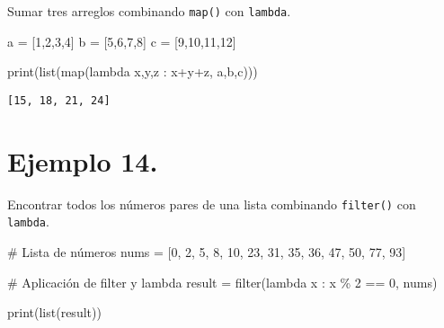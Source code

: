 \documentclass[
  letterpaper,
  DIV=11,
  numbers=noendperiod]{scrreprt}
\newenvironment{Shaded}{\begin{snugshade}}{\end{snugshade}}
\newcommand{\BuiltInTok}[1]{\textcolor[rgb]{0.00,0.23,0.31}{#1}}
\newcommand{\CommentTok}[1]{\textcolor[rgb]{0.37,0.37,0.37}{#1}}
\newcommand{\DecValTok}[1]{\textcolor[rgb]{0.68,0.00,0.00}{#1}}
\newcommand{\KeywordTok}[1]{\textcolor[rgb]{0.00,0.23,0.31}{#1}}
\newcommand{\NormalTok}[1]{\textcolor[rgb]{0.00,0.23,0.31}{#1}}
\newcommand{\OperatorTok}[1]{\textcolor[rgb]{0.37,0.37,0.37}{#1}}
\begin{document}
Sumar tres arreglos combinando \texttt{map()} con \texttt{lambda}.

\begin{Shaded}
\begin{Highlighting}[]
\NormalTok{a }\OperatorTok{=}\NormalTok{ [}\DecValTok{1}\NormalTok{,}\DecValTok{2}\NormalTok{,}\DecValTok{3}\NormalTok{,}\DecValTok{4}\NormalTok{]}
\NormalTok{b }\OperatorTok{=}\NormalTok{ [}\DecValTok{5}\NormalTok{,}\DecValTok{6}\NormalTok{,}\DecValTok{7}\NormalTok{,}\DecValTok{8}\NormalTok{]}
\NormalTok{c }\OperatorTok{=}\NormalTok{ [}\DecValTok{9}\NormalTok{,}\DecValTok{10}\NormalTok{,}\DecValTok{11}\NormalTok{,}\DecValTok{12}\NormalTok{]}

\BuiltInTok{print}\NormalTok{(}\BuiltInTok{list}\NormalTok{(}\BuiltInTok{map}\NormalTok{(}\KeywordTok{lambda}\NormalTok{ x,y,z : x}\OperatorTok{+}\NormalTok{y}\OperatorTok{+}\NormalTok{z, a,b,c)))}
\end{Highlighting}
\end{Shaded}

\begin{verbatim}
[15, 18, 21, 24]
\end{verbatim}

\section{\texorpdfstring{\textbf{Ejemplo
14.}}{Ejemplo 14.}}\label{ejemplo-14.}

Encontrar todos los números pares de una lista combinando
\texttt{filter()} con \texttt{lambda}.

\begin{Shaded}
\begin{Highlighting}[]
\CommentTok{\# Lista de números}
\NormalTok{nums }\OperatorTok{=}\NormalTok{ [}\DecValTok{0}\NormalTok{, }\DecValTok{2}\NormalTok{, }\DecValTok{5}\NormalTok{, }\DecValTok{8}\NormalTok{, }\DecValTok{10}\NormalTok{, }\DecValTok{23}\NormalTok{, }\DecValTok{31}\NormalTok{, }\DecValTok{35}\NormalTok{, }\DecValTok{36}\NormalTok{, }\DecValTok{47}\NormalTok{, }\DecValTok{50}\NormalTok{, }\DecValTok{77}\NormalTok{, }\DecValTok{93}\NormalTok{]}

\CommentTok{\# Aplicación de filter y lambda}
\NormalTok{result }\OperatorTok{=} \BuiltInTok{filter}\NormalTok{(}\KeywordTok{lambda}\NormalTok{ x : x }\OperatorTok{\%} \DecValTok{2} \OperatorTok{==} \DecValTok{0}\NormalTok{, nums)}

\BuiltInTok{print}\NormalTok{(}\BuiltInTok{list}\NormalTok{(result))}
\end{Highlighting}
\end{Shaded}
\end{document}
